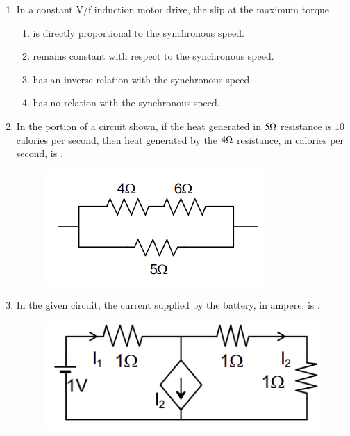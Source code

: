 \documentclass[journal,12pt,onecolumn]{IEEEtran}
\theoremstyle{remark}
\begin{document}
\begin{enumerate}[start=1, label=Q.\arabic*]
    \hfill{}

    \item In a constant V/f induction motor drive, the slip at the maximum torque
    \begin{enumerate}
        \item is directly proportional to the synchronous speed.
        \item remains constant with respect to the synchronous speed.
        \item has an inverse relation with the synchronous speed.
        \item has no relation with the synchronous speed.
    \end{enumerate}

    \hfill{}

    \item In the portion of a circuit shown, if the heat generated in $5\ohm$ resistance is $10$ calories per second, then heat generated by the $4\ohm$ resistance, in calories per second, is \underline{\hspace{2cm}}.
    \begin{figure}[H]
        \includegraphics[width=0.8\columnwidth]{Figures/q17.png}
        \centering
        \caption{}
    \end{figure}

    \hfill{}

    \item In the given circuit, the current supplied by the battery, in ampere, is \underline{\hspace{2cm}}.
    \begin{figure}[H]
        \includegraphics[width=0.5\columnwidth]{Figures/q18.png}
        \centering
        \caption{}
    \end{figure}


\end{enumerate}
\end{document}
